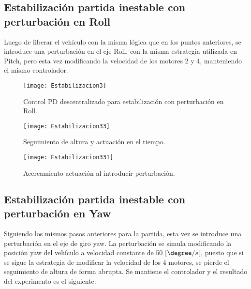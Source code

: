\documentclass[../main.tex]{subfiles}
\begin{document}
\subsection{Estabilización partida inestable con perturbación en Roll}

Luego de liberar el vehículo con la misma lógica que en los puntos
anteriores, se introduce una perturbación en el eje Roll, con la misma
estrategia utilizada en Pitch, pero esta vez modificando la velocidad
de los motores 2 y 4, manteniendo el mismo controlador.

\begin{figure}[H]
\noindent \begin{centering}
\texttt{[image: Estabilizacion3]}
\par\end{centering}
\caption{Control PD descentralizado para estabilización con perturbación en Roll.}
\end{figure}

\begin{figure}[H]
\noindent \begin{centering}
\texttt{[image: Estabilizacion33]}
\par\end{centering}
\caption{Seguimiento de altura y actuación en el tiempo.}
\end{figure}

\begin{figure}[H]
\noindent \begin{centering}
\texttt{[image: Estabilizacion331]}
\par\end{centering}
\caption{Acercamiento actuación al introducir perturbación.}
\end{figure}

\subsection{Estabilización partida inestable con perturbación en Yaw}

Siguiendo los mismos pasos anteriores para la partida, esta vez se
introduce una perturbación en el eje de giro yaw. La perturbación
se simula modificando la posición yaw del vehículo a velocidad constante
de 50 {[}$\degree/s${]}, puesto que si se sigue la estrategia
de modificar la velocidad de los 4 motores, se pierde el seguimiento
de altura de forma abrupta. Se mantiene el controlador y el resultado
del experimento es el siguiente:
\end{document}

